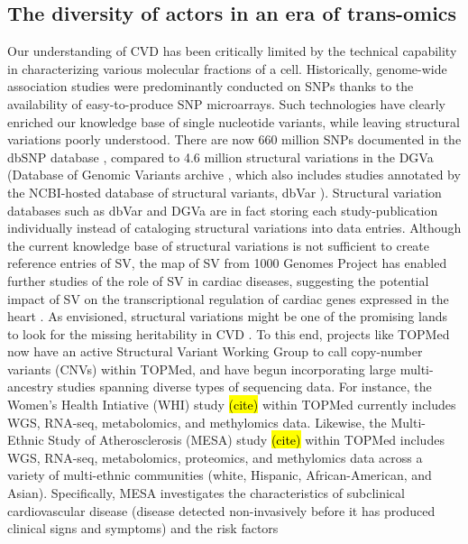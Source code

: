 \documentclass[letter]{bioinfo}
\newcommand{\comment}[1]{\textcolor{red}{#1}}
\begin{document}
	
	
	
\subsection*{The diversity of actors in an era of trans-omics}
	
	
	
	Our understanding of CVD has been critically limited by the technical capability in characterizing various molecular fractions of a cell. Historically, genome-wide association studies were predominantly conducted on SNPs thanks to the availability of easy-to-produce SNP microarrays. Such technologies have clearly enriched our knowledge base of single nucleotide variants, while leaving structural variations poorly understood. There are now 660 million SNPs documented in the dbSNP database \citep{NCBI:2018:dbSNP}, compared to 4.6 million structural variations in the DGVa (Database of Genomic Variants archive \citep{EMBL-EBI:2018:Database}, which also includes studies annotated by the NCBI-hosted database of structural variants, dbVar \citep{NCBI:2018:dbVar}).  Structural variation databases such as dbVar and DGVa are in fact storing each study-publication individually instead of cataloging structural variations into data entries. Although the current knowledge base of structural variations is not sufficient to create reference entries of SV, the map of SV from 1000 Genomes Project \citep{Sudmant:2015:integrated} has enabled further studies of the role of SV in cardiac diseases, suggesting the potential impact of SV on the transcriptional regulation of cardiac genes expressed in the heart \citep{Haas:2018:Genomic}. As envisioned, structural variations might be one of the promising lands to look for the missing heritability in CVD \citep{Eichler:2010:Missing}.  To this end, projects like TOPMed now have an active Structural Variant Working Group to call copy-number variants (CNVs) within TOPMed, and have begun incorporating large multi-ancestry studies spanning diverse types of sequencing data.  For instance, the Women's Health Intiative (WHI) study \hl{(cite)} within TOPMed currently includes WGS, RNA-seq, metabolomics, and methylomics data.  Likewise, the Multi-Ethnic Study of Atherosclerosis (MESA) study \hl{(cite)} within TOPMed includes WGS, RNA-seq, metabolomics, proteomics, and methylomics data across a variety of multi-ethnic communities (white, Hispanic, African-American, and Asian).  Specifically, MESA investigates the characteristics of subclinical cardiovascular disease (disease detected non-invasively before it has produced clinical signs and symptoms) and the risk factors 
\end{document}
